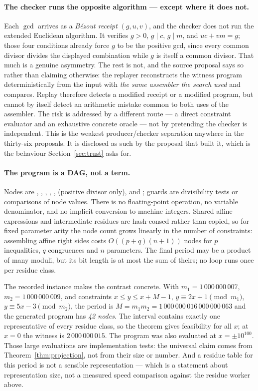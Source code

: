 \paragraph{The checker runs the opposite algorithm --- except where it does not.}
Each $\gcd$ arrives as a \emph{B\'ezout receipt} $(g,u,v)$, and the checker does
not run the extended Euclidean algorithm. It verifies $g>0$, $g\mid c$,
$g\mid m$, and $uc+vm=g$; those four conditions already force $g$ to be the
positive gcd, since every common divisor divides the displayed combination while
$g$ is itself a common divisor. That much is a genuine asymmetry. The rest is
not, and the source proposal says so rather than claiming otherwise: the
replayer reconstructs the witness program deterministically from the input with
\emph{the same assembler the search used} and compares. Replay therefore detects
a modified receipt or a modified program, but cannot by itself detect an
arithmetic mistake common to both uses of the assembler. The risk is addressed
by a different route --- a direct constraint evaluator and an exhaustive
concrete oracle --- not by pretending the checker is independent. This is the
weakest producer/checker separation anywhere in the thirty-six proposals. It is
disclosed as such by the proposal that built it, which is the behaviour
Section~\ref{sec:trust} asks for.

\paragraph{The program is a DAG, not a term.} Nodes are
, , , , , 
(positive divisor only),  and ; guards are divisibility
tests or comparisons of node values. There is no floating-point operation, no
variable denominator, and no implicit conversion to machine integers. Shared
affine expressions and intermediate residues are hash-consed rather than copied,
so for fixed parameter arity the node count grows linearly in the number of
constraints: assembling affine right sides costs $O((p+q)(n+1))$ nodes for $p$
inequalities, $q$ congruences and $n$ parameters. The final period may be a
product of many moduli, but its bit length is at most the sum of theirs; no loop
runs once per residue class.

The recorded instance makes the contrast concrete. With
$m_1=1\,000\,000\,007$, $m_2=1\,000\,000\,009$, and constraints
$x\le y\le x+M-1$, $y\equiv 2x+1\pmod{m_1}$, $y\equiv 5x-3\pmod{m_2}$, the
period is $M=m_1m_2=1\,000\,000\,016\,000\,000\,063$ and the generated program
has \emph{42 nodes}. The interval contains exactly one representative of every
residue class, so the theorem gives feasibility for all $x$; at $x=0$ the
witness is $2\,000\,000\,015$. The program was also evaluated at
$x=\pm10^{100}$. Those large evaluations are implementation tests: the universal
claim comes from Theorem~\ref{thm:projection}, not from their size or number.
And a residue table for this period is not a sensible representation --- which
is a statement about representation size, not a measured speed comparison
against the residue worker above.

